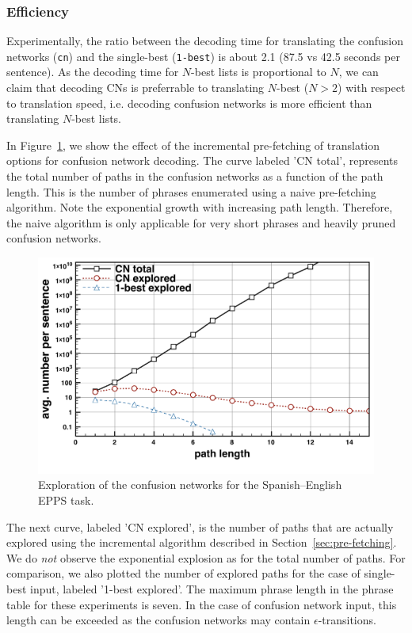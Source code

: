 \documentclass[11pt]{report}
\theoremstyle{plain}
\begin{document}
{\subsubsection{Efficiency}

Experimentally, the ratio between the decoding time for translating the confusion networks ({\tt cn}) and the single-best ({\tt 1-best}) is about 2.1 (87.5 vs 42.5 seconds per sentence). 
As the decoding time for $N$-best lists is proportional to $N$, we can claim that decoding CNs  is preferrable to translating $N$-best ($N>2$) with respect to translation speed, i.e. decoding confusion networks is more efficient than translating $N$-best lists.


In Figure~\ref{fig-cn-exploration}, we show the effect of the incremental pre-fetching of translation options for confusion network decoding.
The curve labeled 'CN total', represents the total number of paths in the confusion networks as a function of the path length.
This is the number of phrases enumerated using a naive pre-fetching algorithm.
Note the exponential growth with increasing path length.
Therefore, the naive algorithm is only applicable for very short phrases and heavily pruned confusion networks.
\begin{figure} 
	\begin{center}
		\includegraphics[width=0.75\linewidth]{CN_PathExploration}
		\caption{Exploration of the confusion networks for the Spanish--English EPPS task.}\label{fig-cn-exploration}
	\end{center}
\end{figure}
The next curve, labeled 'CN explored', is the number of paths that are actually explored using the incremental algorithm described in Section~\ref{sec:pre-fetching}.
We do {\em not} observe the exponential explosion as for the total number of paths.
For comparison, we also plotted the number of explored paths for the case of single-best input, labeled '1-best explored'.
The maximum phrase length in the phrase table for  these experiments is seven.
In the case of confusion network input, this length can be exceeded as the confusion networks may contain $\epsilon$-transitions.




}
\end{document}
